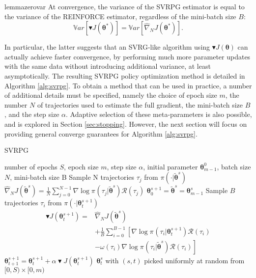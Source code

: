 \documentclass{article}
\theoremstyle{remark}
\theoremstyle{definition}
\newcommand{\vtheta}{\boldsymbol{\theta}}
\newcommand{\Reward}{\mathcal{R}}
\newcommand{\score}[2]{\nabla\log\pi_{#1}(#2)}
\newcommand{\gradApp}[2]{\widehat{\nabla}_{#2}J(#1)}
\newcommand{\gradBlack}[1]{\blacktriangledown J(#1)}
\begin{document}
\begin{restatable}{lemma}{zerovar}\label{lemma:zerovar}
At convergence, the variance of the SVRPG estimator is equal to the variance of the REINFORCE estimator, regardless of the mini-batch size $B$:
\[
	\mathbb{V}ar\left[\gradBlack{\vtheta^*}\right] = 
	\mathbb{V}ar\left[\gradApp{\vtheta^*}{N}\right].
\]
\end{restatable}
In particular, the latter suggests that an SVRG-like algorithm using $\gradBlack{\vtheta}$ can actually achieve faster convergence, by performing much more parameter updates with the same data without introducing additional variance, at least asymptotically.
The resulting SVRPG policy optimization method is detailed in Algorithm \ref{alg:svrpg}.
To obtain a method that can be used in practice, a number of additional details must be specified, namely the choice of epoch size $m$, the number $N$ of trajectories used to estimate the full gradient, the mini-batch size $B$, and the step size $\alpha$. Adaptive selection of these meta-parameters is also possible, and is explored in Section \ref{sec:stopping}. However, the next section will focus on providing general converge guarantees for Algorithm \ref{alg:svrpg}.

\begin{algorithm}[tb]
	\caption{SVRPG}
	\label{alg:svrpg}
	\begin{algorithmic}
		 number of epochs $S$, epoch size $m$, step size $\alpha$, initial parameter $\vtheta_{m-1}^0$, batch size $N$, mini-batch size B
		\STATE Sample N trajectories $\tau_j$ from $\pi(\cdot\vert\tilde{\vtheta}^{s})$
		\STATE $\gradApp{\tilde{\vtheta}^{s}}{N} = \frac{1}{N}\sum_{j=0}^{N-1}\score{}{\tau_j\vert\tilde{\vtheta}^{s}}\Reward(\tau_j)$
		\STATE $\vtheta_0^{s+1} = \tilde{\vtheta}^s = \vtheta_{m-1}^s$
		\STATE Sample $B$ trajectories $\tau_i$ from 				$\pi(\cdot\vert\vtheta_t^{s+1})$
		\STATE 
		\begin{align*}
		\blacktriangledown J(\vtheta_t^{s+1}) = 
		&\gradApp{\tilde{\vtheta}^s}{N} \\
		&+\frac{1}{B}\sum_{i=0}^{B-1}\left[ 
		\score{}{\tau_i\vert\vtheta_t^{s+1}}\Reward(\tau_i)\right. \\
		&\left. - \omega(\tau_i)\score{}{\tau_i \vert \tilde{\vtheta}^{s}}\Reward(\tau_i)\right]
		\end{align*}
		\STATE $\vtheta_{t+1}^{s+1} = \vtheta_t^{s+1} + \alpha\blacktriangledown J(\vtheta_t^{s+1})$
		\ENDFOR
		\ENDFOR
		 $\vtheta_t^s$ with $(s,t)$ picked uniformly at random from $[0,S)\times[0,m)$
	\end{algorithmic}
\end{algorithm}
\end{document}

